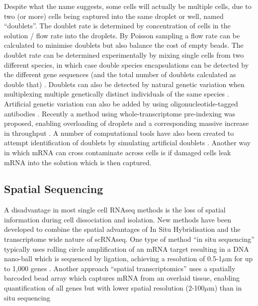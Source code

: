 Despite what the name suggests, some cells will actually be multiple cells, due to two (or more) cells being captured into the same droplet or well, named ``doublets''. The doublet rate is determined by concentration of cells in the solution / flow rate into the droplets. By Poisson sampling a flow rate can be calculated to minimise doublets but also balance the cost of empty beads. The doublet rate can be determined experimentally by mixing single cells from two different species, in which case double species encapsulations can be detected by the different gene sequences (and the total number of doublets calculated as double that) \parencite{Macosko2015Highly}.  Doublets can also be detected by natural genetic variation when multiplexing multiple genetically distinct individuals of the same species \parencite{Kang2018Multiplexed}. Artificial genetic variation can also be added by using oligonucleotide-tagged antibodies \parencite{Stoeckius2018Cell}. Recently a method using whole-transcriptome pre-indexing was proposed, enabling overloading of droplets and a corresponding massive increase in throughput \parencite{Datlinger2019Ultrahigh}. A number of computational tools have also been created to attempt identification of doublets by simulating artificial doublets \parencite{Wolock2019Scrublet, McGinnis2019DoubletFinder}. Another way in which mRNA can cross contaminate across cells is if damaged cells leak mRNA into the solution which is then captured.



\subsection{Spatial Sequencing}
A disadvantage in most single cell RNAseq methods is the loss of spatial information during cell dissociation and isolation. New methods have been developed to combine the spatial advantages of In Situ Hybridisation and the transcriptome wide nature of scRNAseq. One type of method ``in situ sequencing'' typically uses rolling circle amplification of an mRNA target resulting in a DNA nano-ball which is sequenced by ligation, achieving a resolution of 0.5-1$\mu$m for up to 1,000 genes \parencite{Lee2014Highly, Wang2018Threedimensional, Qian2018spatial}. Another approach ``spatial transcriptomics'' uses a spatially barcoded bead array which captures mRNA from an overlaid tissue, enabling quantification of all genes but with lower spatial resolution (2-100$\mu$m) than in situ sequencing \parencite{Stahl2016Visualization, Rodriques2019Slideseq, Vickovic2019Highdefinition}


